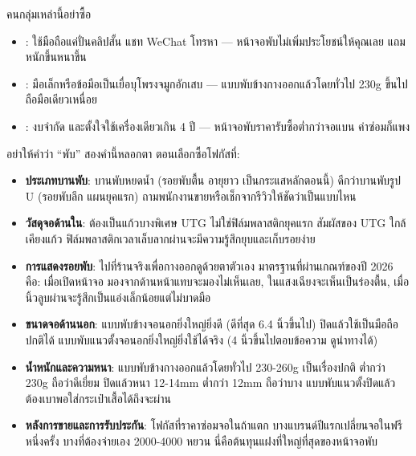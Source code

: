 \begin{tcbwarn}{คนกลุ่มเหล่านี้อย่าซื้อ}
\begin{itemize}
  \item : ใช้มือถือแค่ปั่นคลิปสั้น แชท WeChat โทรหา — หน้าจอพับไม่เพิ่มประโยชน์ให้คุณเลย แถมหนักขึ้นหนาขึ้น
  \item : มือเล็กหรือข้อมือเป็นเยื่อบุโพรงจมูกอักเสบ — แบบพับข้างกางออกแล้วโดยทั่วไป 230g ขึ้นไป ถือมือเดียวเหนื่อย
  \item : งบจำกัด และตั้งใจใช้เครื่องเดียวเกิน 4 ปี — หน้าจอพับราคารับซื้อต่ำกว่าจอแบน ค่าซ่อมก็แพง
\end{itemize}

\end{tcbwarn}


อย่าให้คำว่า “พับ” สองคำนี้หลอกตา ตอนเลือกซื้อโฟกัสที่:

\begin{itemize}
  \item \textbf{ประเภทบานพับ}: บานพับหยดน้ำ (รอยพับตื้น อายุยาว เป็นกระแสหลักตอนนี้) ดีกว่าบานพับรูป U (รอยพับลึก แผนยุคแรก) ถามพนักงานขายหรือเช็กจากรีวิวให้ชัดว่าเป็นแบบไหน
  \item \textbf{วัสดุจอด้านใน}: ต้องเป็นแก้วบางพิเศษ UTG ไม่ใช่ฟิล์มพลาสติกยุคแรก สัมผัสของ UTG ใกล้เคียงแก้ว ฟิล์มพลาสติกเวลาเล็บลากผ่านจะมีความรู้สึกยุบและเก็บรอยง่าย
  \item \textbf{การแสดงรอยพับ}: ไปที่ร้านจริงเพื่อกางออกดูด้วยตาตัวเอง มาตรฐานที่ผ่านเกณฑ์ของปี 2026 คือ: เมื่อเปิดหน้าจอ มองจากด้านหน้าแทบจะมองไม่เห็นเลย, ในแสงเฉียงจะเห็นเป็นร่องตื้น, เมื่อนิ้วลูบผ่านจะรู้สึกเป็นแอ่งเล็กน้อยแต่ไม่บาดมือ
  \item \textbf{ขนาดจอด้านนอก}: แบบพับข้างจอนอกยิ่งใหญ่ยิ่งดี (ดีที่สุด 6.4 นิ้วขึ้นไป) ปิดแล้วใช้เป็นมือถือปกติได้ แบบพับแนวตั้งจอนอกยิ่งใหญ่ยิ่งใช้ได้จริง (4 นิ้วขึ้นไปตอบข้อความ ดูนำทางได้)
  \item \textbf{น้ำหนักและความหนา}: แบบพับข้างกางออกแล้วโดยทั่วไป 230-260g เป็นเรื่องปกติ ต่ำกว่า 230g ถือว่าดีเยี่ยม ปิดแล้วหนา 12-14mm ต่ำกว่า 12mm ถือว่าบาง แบบพับแนวตั้งปิดแล้วต้องเบาพอใส่กระเป๋าเสื้อได้ถึงจะผ่าน
  \item \textbf{หลังการขายและการรับประกัน}: โฟกัสที่ราคาซ่อมจอในถ้าแตก บางแบรนด์ปีแรกเปลี่ยนจอในฟรีหนึ่งครั้ง บางที่ต้องจ่ายเอง 2000-4000 หยวน นี่คือต้นทุนแฝงที่ใหญ่ที่สุดของหน้าจอพับ
\end{itemize}

